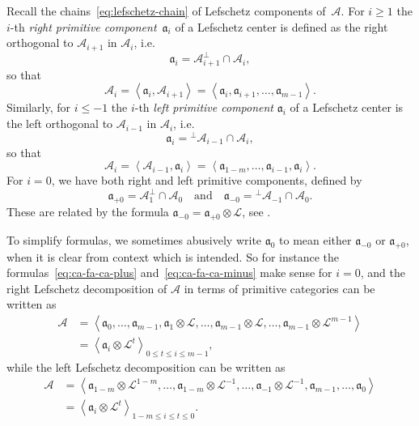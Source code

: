 \documentclass[11pt, reqno]{amsart}
\numberwithin{equation}{section}
\theoremstyle{plain}
\theoremstyle{definition}
\newcommand{\llangle}{\left \langle}
\newcommand{\rrangle}{\right \rangle}
\newcommand{\cA}{\mathcal{A}}
\newcommand{\cL}{\mathcal{L}}
\newcommand{\fa}{\mathfrak{a}}
\begin{document}
Recall the chains~\eqref{eq:lefschetz-chain} of Lefschetz components of~$\cA$.
For $i \ge 1$ the $i$-th \emph{right primitive component}~$\fa_i$ of a Lefschetz center is 
defined as the right orthogonal to $\cA_{i+1}$ in $\cA_i$, i.e.  
\begin{equation*}
\fa_i = \cA_{i+1}^\perp \cap \cA_{i},
\end{equation*}
so that 
\begin{equation}
\label{eq:ca-fa-ca-plus}
\cA_i = \llangle \fa_i, \cA_{i+1} \rrangle =  \llangle \fa_i, \fa_{i+1}, \dots, \fa_{m-1} \rrangle. 
\end{equation}
Similarly, for $i \le {-1}$ the $i$-th \emph{left primitive component} $\fa_i$ of a Lefschetz center is 
the left orthogonal to $\cA_{i-1}$ in $\cA_i$, i.e. 
\begin{equation*}
\fa_i = {}^\perp\cA_{i-1} \cap \cA_{i}, 
\end{equation*}
so that 
\begin{equation}
\label{eq:ca-fa-ca-minus}
\cA_i = \llangle \cA_{i-1}, \fa_{i} \rrangle = \llangle \fa_{1-m}, \dots, \fa_{i-1}, \fa_{i} \rrangle. 
\end{equation}
For $i = 0$, we have both right and left primitive components, defined by  
\begin{equation*}
\fa_{+0} = \cA_1^{\perp} \cap \cA_0 \quad \text{and} \quad 
\fa_{-0} = {}^\perp\cA_{-1} \cap \cA_0.
\end{equation*}
These are related by the formula $\fa_{-0} = \fa_{+0} \otimes \cL$, see \cite[Remark 6.4]{NCHPD}. 

To simplify formulas, we sometimes abusively write $\fa_0$ to mean either $\fa_{-0}$ or $\fa_{+0}$, when 
it is clear from context which is intended. 
So for instance the formulas~\eqref{eq:ca-fa-ca-plus} and~\eqref{eq:ca-fa-ca-minus} make sense for $i = 0$, and  
the right Lefschetz decomposition of $\cA$ in terms of primitive categories can be written as
\begin{equation}
\label{eq:ca-primitive-plus}
\begin{aligned}
\cA & = \llangle \fa_0, \dots ,\fa_{m-1}, \fa_1 \otimes \cL, \dots, \fa_{m-1} \otimes \cL, \dots, \fa_{m-1} \otimes \cL^{m-1} \rrangle \\
& = \llangle \fa_i \otimes \cL^t \rrangle_{0 \le t \le i \le m-1}, 
\end{aligned}
\end{equation}
while the left Lefschetz decomposition can be written as
\begin{equation}
\label{eq:ca-primitive-minus}
\begin{aligned}
\cA & = \llangle \fa_{1-m} \otimes \cL^{1-m}, \dots, \fa_{1-m} \otimes \cL^{-1}, \dots, \fa_{-1} \otimes \cL^{-1}, \fa_{m-1}, \dots, \fa_0 \rrangle  \\
& = \llangle \fa_i \otimes \cL^t \rrangle_{1-m \leq i \leq t \leq 0}. 
\end{aligned}
\end{equation}
\end{document}
